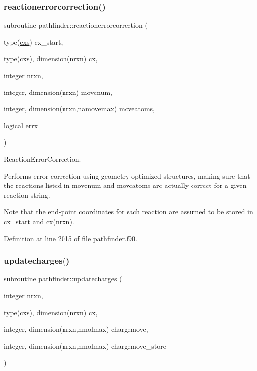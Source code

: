 \subsubsection{\texorpdfstring{reactionerrorcorrection()}{reactionerrorcorrection()}}
{\footnotesize\ttfamily subroutine pathfinder\+::reactionerrorcorrection (\begin{DoxyParamCaption}\item[{type(\mbox{\hyperlink{structchemstr_1_1cxs}{cxs}})}]{cx\+\_\+start,  }\item[{type(\mbox{\hyperlink{structchemstr_1_1cxs}{cxs}}), dimension(nrxn)}]{cx,  }\item[{integer}]{nrxn,  }\item[{integer, dimension(nrxn)}]{movenum,  }\item[{integer, dimension(nrxn,namovemax)}]{moveatoms,  }\item[{logical}]{errx }\end{DoxyParamCaption})}



Reaction\+Error\+Correction. 

Performs error correction using geometry-\/optimized structures, making sure that the reactions listed in movenum and moveatoms are actually correct for a given reaction string.

Note that the end-\/point coordinates for each reaction are assumed to be stored in cx\+\_\+start and cx(nrxn). 

Definition at line 2015 of file pathfinder.\+f90.

\mbox{\label{namespacepathfinder_a6163bb10d42d544518d19ae3f48e5a24}} 
\subsubsection{\texorpdfstring{updatecharges()}{updatecharges()}}
{\footnotesize\ttfamily subroutine pathfinder\+::updatecharges (\begin{DoxyParamCaption}\item[{integer}]{nrxn,  }\item[{type(\mbox{\hyperlink{structchemstr_1_1cxs}{cxs}}), dimension(nrxn)}]{cx,  }\item[{integer, dimension(nrxn,nmolmax)}]{chargemove,  }\item[{integer, dimension(nrxn,nmolmax)}]{chargemove\+\_\+store }\end{DoxyParamCaption})}



